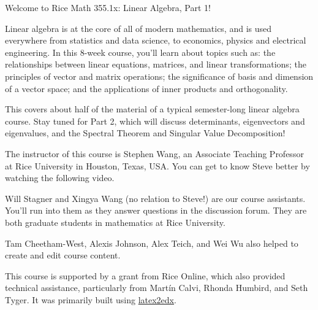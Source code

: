 





Welcome to Rice Math 355.1x: Linear Algebra, Part 1!  



Linear algebra is at the core of all of modern mathematics, and is used everywhere from statistics and data science, to economics, physics and electrical engineering.  
In this 8-week course, you'll learn about topics such as: the relationships between linear equations, matrices, and linear transformations; the principles of vector and matrix operations; the significance of basis and dimension of a vector space; and the applications of inner products and orthogonality. 

This covers about half of the material of a typical semester-long linear algebra course.  Stay tuned for Part 2, which
will discuss determinants, eigenvectors and eigenvalues, and the Spectral Theorem and Singular Value Decomposition!  

\endedxtext




\endedxvertical





The instructor of this course is Stephen Wang, an Associate Teaching Professor at Rice University in Houston, Texas, USA.  
You can get to know Steve better by watching the following video.  

\endedxtext



Will Stagner and Xingya Wang (no relation to Steve!) are our course assistants.  You'll run into them as they answer questions in the discussion forum.  They are both graduate students in mathematics at Rice University.  

Tam Cheetham-West, Alexis Johnson, Alex Teich, and Wei Wu also helped to create and edit course content.  

This course is supported by a grant from Rice Online, which also provided technical assistance, particularly from 
Mart\'{i}n Calvi, Rhonda Humbird, and Seth Tyger.  It was primarily built using \href{https://people.csail.mit.edu/ichuang/edx/latex2edx.php}{latex2edx}.  

